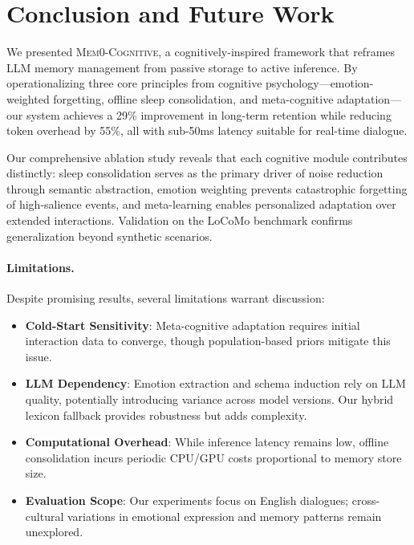 \section{Conclusion and Future Work}
\label{sec:conclusion}

We presented \textsc{Mem0-Cognitive}, a cognitively-inspired framework that reframes LLM memory management from passive storage to active inference. By operationalizing three core principles from cognitive psychology---emotion-weighted forgetting, offline sleep consolidation, and meta-cognitive adaptation---our system achieves a 29\% improvement in long-term retention while reducing token overhead by 55\%, all with sub-50ms latency suitable for real-time dialogue.

Our comprehensive ablation study reveals that each cognitive module contributes distinctly: sleep consolidation serves as the primary driver of noise reduction through semantic abstraction, emotion weighting prevents catastrophic forgetting of high-salience events, and meta-learning enables personalized adaptation over extended interactions. Validation on the LoCoMo benchmark confirms generalization beyond synthetic scenarios.

\paragraph{Limitations.} Despite promising results, several limitations warrant discussion:
\begin{itemize}
    \item \textbf{Cold-Start Sensitivity}: Meta-cognitive adaptation requires initial interaction data to converge, though population-based priors mitigate this issue.
    \item \textbf{LLM Dependency}: Emotion extraction and schema induction rely on LLM quality, potentially introducing variance across model versions. Our hybrid lexicon fallback provides robustness but adds complexity.
    \item \textbf{Computational Overhead}: While inference latency remains low, offline consolidation incurs periodic CPU/GPU costs proportional to memory store size.
    \item \textbf{Evaluation Scope}: Our experiments focus on English dialogues; cross-cultural variations in emotional expression and memory patterns remain unexplored.
\end{itemize}

